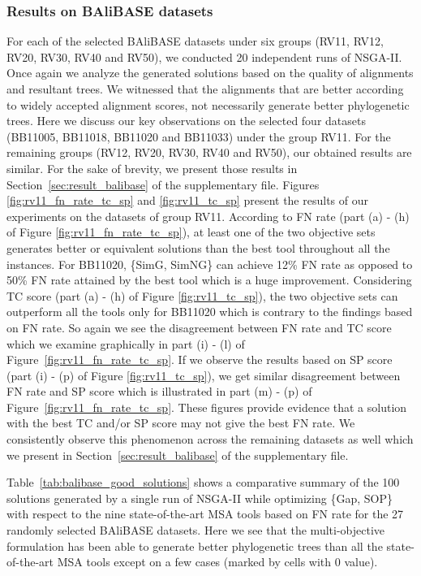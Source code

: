 \subsubsection{Results on BAliBASE datasets}
For each of the selected BAliBASE datasets under six groups (RV11, RV12, RV20, RV30, RV40 and RV50), we conducted 20 independent runs of NSGA-II. Once again we analyze the generated solutions based on the quality of alignments and resultant trees. We witnessed that the alignments that are better according to widely accepted alignment scores, not necessarily generate better phylogenetic trees.
Here we discuss our key observations on the selected four datasets (BB11005, BB11018, BB11020 and BB11033) under the group RV11. For the remaining groups (RV12, RV20, RV30, RV40 and RV50), our obtained results are similar. For the sake of brevity, we present those results in Section~\ref{sec:result_balibase} of the supplementary file. Figures \ref{fig:rv11_fn_rate_tc_sp} and \ref{fig:rv11_tc_sp} present the results of our experiments on the datasets of group RV11. According to FN rate (part (a) - (h) of Figure \ref{fig:rv11_fn_rate_tc_sp}), at least one of the two objective sets generates better or equivalent solutions than the best tool throughout all the instances. For BB11020, \{SimG, SimNG\} can achieve 12\% FN rate as opposed to 50\% FN rate attained by the best tool which is a huge improvement. Considering TC score (part (a) - (h) of Figure \ref{fig:rv11_tc_sp}), the two objective sets can outperform all the tools only for BB11020 which is contrary to the findings based on FN rate. So again we see the disagreement between FN rate and TC score which we examine graphically in part (i) - (l) of Figure~\ref{fig:rv11_fn_rate_tc_sp}. If we observe the results based on SP score (part (i) - (p) of Figure \ref{fig:rv11_tc_sp}), we get similar disagreement between FN rate and SP score which is illustrated in part (m) - (p) of Figure~\ref{fig:rv11_fn_rate_tc_sp}. These figures provide evidence that a solution with the best TC and/or SP score may not give the best FN rate. We consistently observe this phenomenon across the remaining datasets as well which we present in Section~\ref{sec:result_balibase} of the supplementary file.

Table~\ref{tab:balibase_good_solutions} shows a comparative summary of the 100 solutions generated by a single run of NSGA-II while optimizing \{Gap, SOP\} with respect to the nine state-of-the-art MSA tools based on FN rate for the 27 randomly selected BAliBASE datasets. Here we see that the multi-objective formulation has been able to generate better phylogenetic trees than all the state-of-the-art MSA tools except on a few cases (marked by cells with 0 value).

